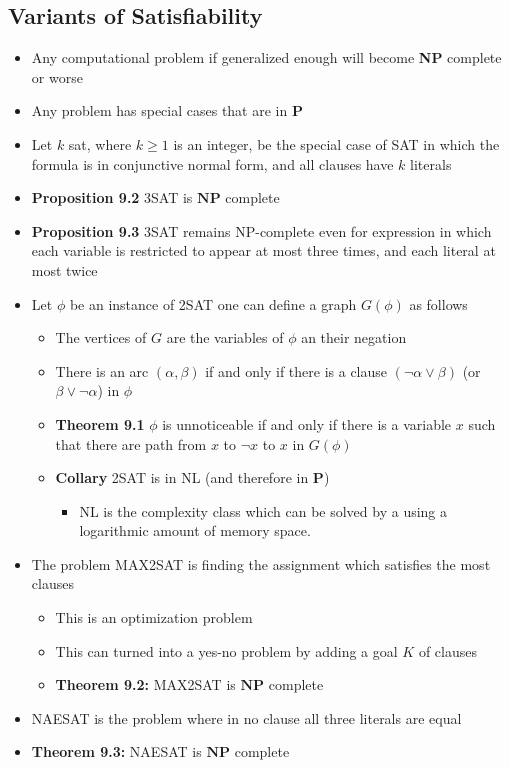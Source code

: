 \documentclass[11pt]{article}
\begin{document}
\subsection{Variants of Satisfiability}
\label{sec:org98b8722}
\begin{itemize}
\item Any computational problem if generalized enough will become \textbf{NP} complete or worse
\item Any problem has special cases that are in \(\mathbf{P}\)
\item Let \(k\) sat, where \(k \geq 1\) is an integer, be the special case of SAT in which the formula is in conjunctive normal form, and all clauses have \(k\) literals
\item \textbf{Proposition 9.2} 3SAT is \(\mathbf{NP}\) complete
\item \textbf{Proposition 9.3} 3SAT remains NP-complete even for expression in which each variable is restricted to appear at most three times, and each literal at most twice

\item Let \(\phi\) be an instance of 2SAT one can define a graph \(G(\phi)\) as follows
\begin{itemize}
\item The vertices of \(G\) are the variables of \(\phi\) an their negation
\item There is an arc \((\alpha, \beta)\) if and only if there is a clause \((\neg \alpha \lor \beta)\) (or \(\beta \lor \neg \alpha\)) in \(\phi\)
\item \textbf{Theorem 9.1} \(\phi\) is unnoticeable if and only if there is a variable \(x\) such that there are path from \(x\) to \(\neg x\) to \(x\) in \(G(\phi)\)
\item \textbf{Collary} 2SAT is in NL (and therefore in \(\mathbf P\))
\begin{itemize}
\item NL is the complexity class which can be solved by a using a logarithmic amount of memory space.
\end{itemize}
\end{itemize}

\item The problem MAX2SAT is finding the assignment which satisfies the most clauses
\begin{itemize}
\item This is an optimization problem
\item This can turned into a yes-no problem by adding a goal \(K\) of clauses
\item \textbf{Theorem 9.2:} MAX2SAT is \(\mathbf{NP}\) complete
\end{itemize}

\item NAESAT is the problem where in no clause all three literals are equal
\item \textbf{Theorem 9.3:} NAESAT is \(\mathbf{NP}\) complete
\end{itemize}
\end{document}
